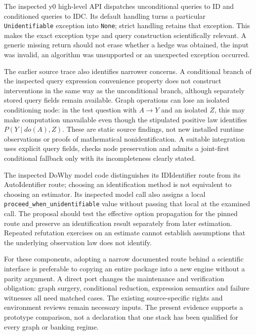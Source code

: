 The inspected y0 high-level API dispatches unconditional
queries to ID and conditioned queries to IDC. Its
default handling turns a particular
\texttt{Unidentifiable} exception into \texttt{None};
strict handling retains that exception. This makes
the exact exception type and query construction
scientifically relevant. A generic missing return
should not erase whether a hedge was obtained, the
input was invalid, an algorithm was unsupported or
an unexpected exception occurred.\citep{exec13_y0_api,exec13_y0_id,exec13_y0_idc}

The earlier source trace also identifies narrower
concerns. A conditional branch of the inspected query
expression convenience property does not construct
interventions in the same way as the unconditional
branch, although separately stored query fields
remain available. Graph operations can lose an
isolated conditioning node: in the test question
with $A\to Y$ and an isolated $Z$, this may make
computation unavailable even though the stipulated
positive law identifies $P(Y\mid do(A),Z)$.
These are static source findings, not new installed
runtime observations or proofs of mathematical
nonidentification. A suitable integration uses explicit
query fields, checks node preservation and admits a
joint-first conditional fallback only with its
incompleteness clearly stated.\citep{exec13_y0_api,exec13_y0_graph,exec13_y0_dsl,exec13_y0_utils,exec13_y0_rule2,exec13_y0_separation}

The inspected DoWhy model code distinguishes its
IDIdentifier route from its AutoIdentifier route;
choosing an identification method is not equivalent
to choosing an estimator. Its inspected model call
also assigns a local
\texttt{proceed\_when\_unidentifiable} value without
passing that local at the examined call. The proposal
should test the effective option propagation for
the pinned route and preserve an identification
result separately from later estimation. Repeated
refutation exercises on an estimate cannot establish
assumptions that the underlying observation law
does not identify.\citep{exec13_dowhy}

For these components, adopting a narrow documented
route behind a scientific interface is preferable
to copying an entire package into a new engine
without a parity argument. A direct port changes
the maintenance and verification obligation:
graph surgery, conditional reduction, expression
semantics and failure witnesses all need matched
cases. The existing source-specific rights and
environment reviews remain necessary inputs.
The present evidence supports a prototype comparison,
not a declaration that one stack has been qualified
for every graph or banking regime.

